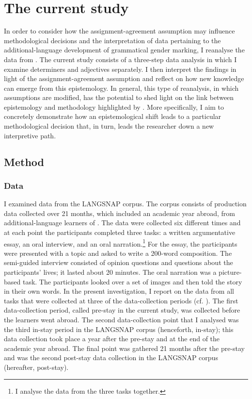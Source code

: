 \documentclass[output=paper,colorlinks,citecolor=brown,modfonts,nonflat]{../langscibook}
\begin{document}
\newpage
\section{The current study}\label{sec:gudmestad:3}

In order to consider how the assignment-agreement assumption may influence methodological decisions and the interpretation of data pertaining to the ad\-di\-tion\-al-lang\-uage development of grammatical gender marking, I reanalyse the data from \citet{GudmestadEtAl2019}. The current study consists of a three-step data analysis in which I examine determiners and adjectives separately. I then interpret the findings in light of the assignment-agreement assumption and reflect on how new knowledge can emerge from this epistemology. In general, this type of reanalysis, in which assumptions are modified, has the potential to shed light on the link between epistemology and methodology highlighted by \citet{Ortega2005}. More specifically, I aim to concretely demonstrate how an epistemological shift leads to a particular methodological decision that, in turn, leads the researcher down a new interpretive path.


\subsection{Method}\label{sec:gudmestad:3.1}

\subsubsection{Data}\label{sec:gudmestad:3.1.1}

I examined data from the LANGSNAP corpus. The corpus consists of production data collected over 21 months, which included an academic year abroad, from additional-language learners of . The data were collected six different times and at each point the participants completed three tasks: a written argumentative essay, an oral interview, and an oral narration.\footnote{{I analyse the data from the three tasks together.}} For the essay, the participants were presented with a topic and asked to write a 200-word composition. The semi-guided interview consisted of opinion questions and questions about the participants’ lives; it lasted about 20 minutes. The oral narration was a picture-based task. The participants looked over a set of images and then told the story in their own words. In the present investigation, I report on the data from all tasks that were collected at three of the data-collection periods (cf. \citealt{GudmestadEtAl2019}). The first data-collection period, called pre-stay in the current study, was collected before the learners went abroad. The second data-collection point that I analysed was the third in-stay period in the LANGSNAP corpus (henceforth, in-stay); this data collection took place a year after the pre-stay and at the end of the academic year abroad. The final point was gathered 21 months after the pre-stay and was the second post-stay data collection in the LANGSNAP corpus (hereafter, post-stay).
\largerpage
\end{document}
